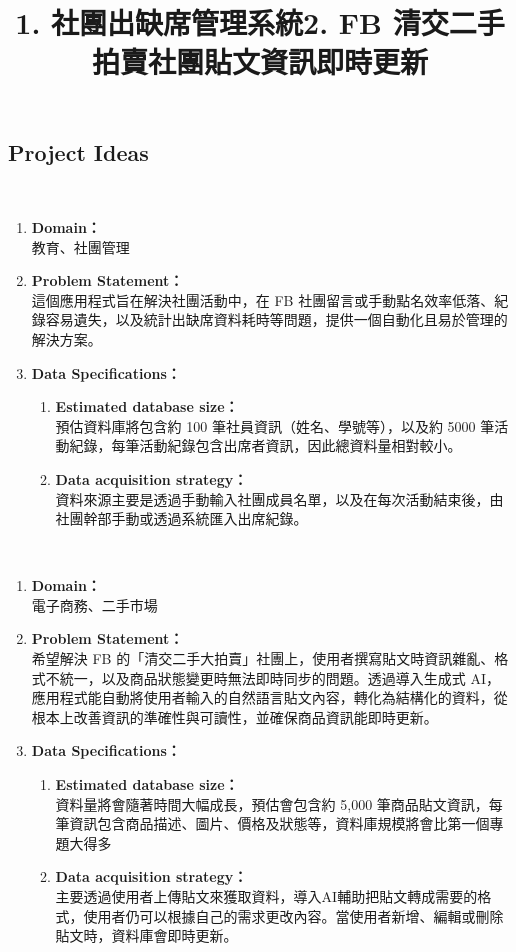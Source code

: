 \subsection{Project Ideas}
\ \\
\title{\bf{1. 社團出缺席管理系統}}
\begin{enumerate}
    \item {\bf{Domain：}} \\教育、社團管理
    \item {\bf{Problem Statement：}} \\這個應用程式旨在解決社團活動中，在 FB 社團留言或手動點名效率低落、紀錄容易遺失，以及統計出缺席資料耗時等問題，提供一個自動化且易於管理的解決方案。
    \item {\bf{Data Specifications：}}
        \begin{enumerate}
            \item {\bf{Estimated database size：}} \\預估資料庫將包含約 100 筆社員資訊（姓名、學號等），以及約 5000 筆活動紀錄，每筆活動紀錄包含出席者資訊，因此總資料量相對較小。
            \item {\bf{Data acquisition strategy：}} \\資料來源主要是透過手動輸入社團成員名單，以及在每次活動結束後，由社團幹部手動或透過系統匯入出席紀錄。
        \end{enumerate}
\end{enumerate}
\ \\
\title{\bf{2. FB 清交二手拍賣社團貼文資訊即時更新}}
\begin{enumerate}
    \item {\bf{Domain：}} \\電子商務、二手市場
    \item {\bf{Problem Statement：}} \\希望解決 FB 的「清交二手大拍賣」社團上，使用者撰寫貼文時資訊雜亂、格式不統一，以及商品狀態變更時無法即時同步的問題。透過導入生成式 AI，應用程式能自動將使用者輸入的自然語言貼文內容，轉化為結構化的資料，從根本上改善資訊的準確性與可讀性，並確保商品資訊能即時更新。
    \item {\bf{Data Specifications：}}
        \begin{enumerate}
            \item {\bf{Estimated database size：}} \\資料量將會隨著時間大幅成長，預估會包含約 5,000 筆商品貼文資訊，每筆資訊包含商品描述、圖片、價格及狀態等，資料庫規模將會比第一個專題大得多
            \item {\bf{Data acquisition strategy：}} \\主要透過使用者上傳貼文來獲取資料，導入AI輔助把貼文轉成需要的格式，使用者仍可以根據自己的需求更改內容。當使用者新增、編輯或刪除貼文時，資料庫會即時更新。
        \end{enumerate}
\end{enumerate}
